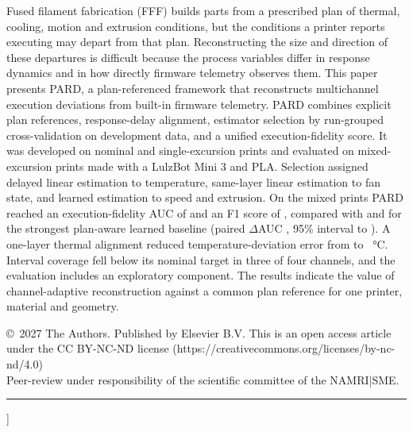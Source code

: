 \documentclass[10pt,a4paper,twocolumn]{article}
\begin{document}
{\begin{minipage}{\textwidth}
Fused filament fabrication (FFF) builds parts from a prescribed plan of thermal, cooling, motion and extrusion conditions, but the conditions a printer reports executing may depart from that plan. Reconstructing the size and direction of these departures is difficult because the process variables differ in response dynamics and in how directly firmware telemetry observes them. This paper presents PARD, a plan-referenced framework that reconstructs multichannel execution deviations from built-in firmware telemetry. PARD combines explicit plan references, response-delay alignment, estimator selection by run-grouped cross-validation on development data, and a unified execution-fidelity score. It was developed on \printsDev{} nominal and single-excursion prints and evaluated on \printsTest{} mixed-excursion prints made with a LulzBot Mini 3 and PLA. Selection assigned delayed linear estimation to temperature, same-layer linear estimation to fan state, and learned estimation to speed and extrusion. On the mixed prints PARD reached an execution-fidelity AUC of \aucPard{} and an F1 score of \fonePard{}, compared with \aucBthree{} and \foneBthree{} for the strongest plan-aware learned baseline (paired $\Delta$AUC \dAucBthree{}, 95\% interval \dAucBthreeLo{} to \dAucBthreeHi{}). A one-layer thermal alignment reduced temperature-deviation error from \thDelayZero{} to \thDelayOne{}~\si{\celsius}. Interval coverage fell below its nominal target in three of four channels, and the evaluation includes an exploratory component. The results indicate the value of channel-adaptive reconstruction against a common plan reference for one printer, material and geometry.\par
\vspace{4pt}\noindent\copyright\ 2027 The Authors. Published by Elsevier B.V. This is an open access article under the CC BY-NC-ND license (https://creativecommons.org/licenses/by-nc-nd/4.0)\\
Peer-review under responsibility of the scientific committee of the NAMRI|SME.\par
\vspace{2pt}
\end{minipage}
\vspace{6pt}\hrule\vspace{8pt}
}]
\end{document}
